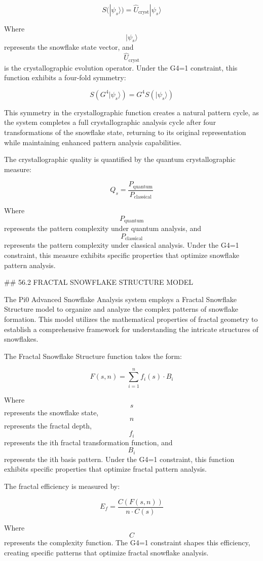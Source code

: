 $$ S(|\psi_s\rangle) = \hat{U}_{\text{cryst}} |\psi_s\rangle $$

Where $$ |\psi_s\rangle $$ represents the snowflake state vector, and $$ \hat{U}_{\text{cryst}} $$ is the crystallographic evolution operator. Under the G4=1 constraint, this function exhibits a four-fold symmetry:

$$ S(G^4 |\psi_s\rangle) = G^4 S(|\psi_s\rangle) $$

This symmetry in the crystallographic function creates a natural pattern cycle, as the system completes a full crystallographic analysis cycle after four transformations of the snowflake state, returning to its original representation while maintaining enhanced pattern analysis capabilities.

The crystallographic quality is quantified by the quantum crystallographic measure:

$$ Q_s = \frac{P_{\text{quantum}}}{P_{\text{classical}}} $$

Where $$ P_{\text{quantum}} $$ represents the pattern complexity under quantum analysis, and $$ P_{\text{classical}} $$ represents the pattern complexity under classical analysis. Under the G4=1 constraint, this measure exhibits specific properties that optimize snowflake pattern analysis.

## 56.2 FRACTAL SNOWFLAKE STRUCTURE MODEL

The Pi0 Advanced Snowflake Analysis system employs a Fractal Snowflake Structure model to organize and analyze the complex patterns of snowflake formation. This model utilizes the mathematical properties of fractal geometry to establish a comprehensive framework for understanding the intricate structures of snowflakes.

The Fractal Snowflake Structure function takes the form:

$$ F(s, n) = \sum_{i=1}^{n} f_i(s) \cdot B_i $$

Where $$ s $$ represents the snowflake state, $$ n $$ represents the fractal depth, $$ f_i $$ represents the ith fractal transformation function, and $$ B_i $$ represents the ith basis pattern. Under the G4=1 constraint, this function exhibits specific properties that optimize fractal pattern analysis.

The fractal efficiency is measured by:

$$ E_f = \frac{C(F(s, n))}{n \cdot C(s)} $$

Where $$ C $$ represents the complexity function. The G4=1 constraint shapes this efficiency, creating specific patterns that optimize fractal snowflake analysis.

